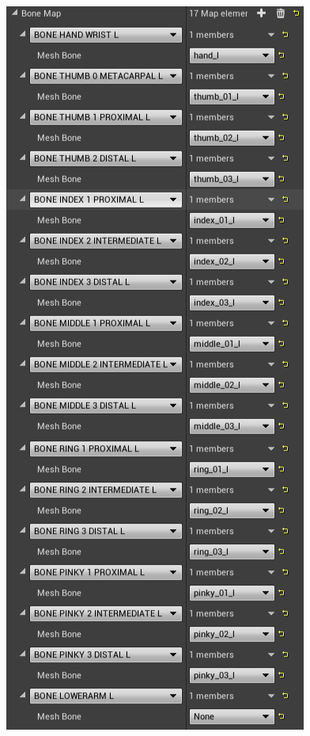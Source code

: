 \begin{table}[!htb]
    \begin{minipage}{\linewidth}
        \centering
        \begin{subfigure}{0.49\textwidth}
            \centering
            \includegraphics[width=\textwidth]{figures/mappedBones.png}

\end{subfigure}
\end{minipage}
\end{table}
